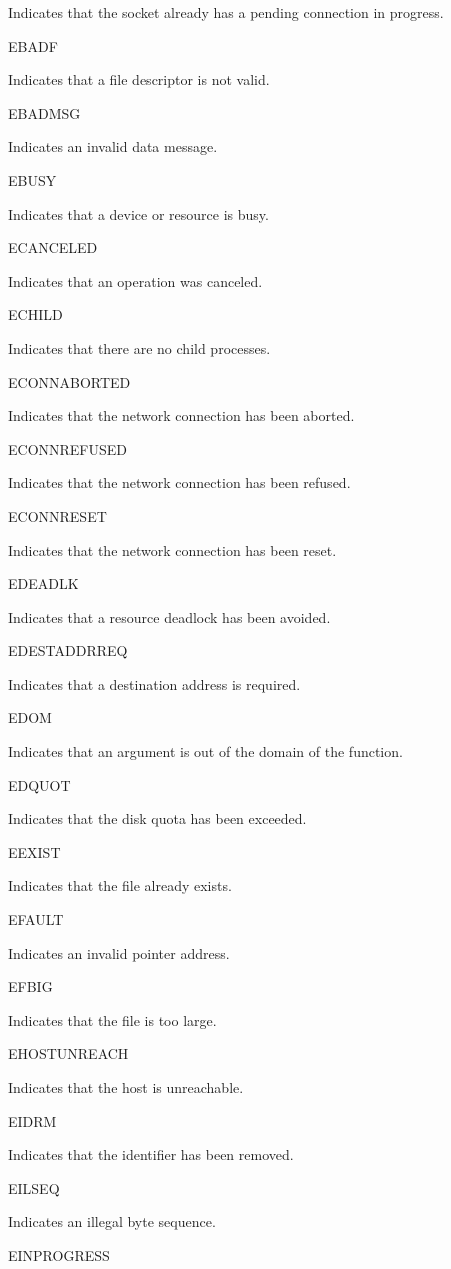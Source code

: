 Indicates that the socket already has a pending connection in progress.

EBADF

Indicates that a file descriptor is not valid.

EBADMSG

Indicates an invalid data message.

EBUSY

Indicates that a device or resource is busy.

ECANCELED

Indicates that an operation was canceled.

ECHILD

Indicates that there are no child processes.

ECONNABORTED

Indicates that the network connection has been aborted.

ECONNREFUSED

Indicates that the network connection has been refused.

ECONNRESET

Indicates that the network connection has been reset.

EDEADLK

Indicates that a resource deadlock has been avoided.

EDESTADDRREQ

Indicates that a destination address is required.

EDOM

Indicates that an argument is out of the domain of the function.

EDQUOT

Indicates that the disk quota has been exceeded.

EEXIST

Indicates that the file already exists.

EFAULT

Indicates an invalid pointer address.

EFBIG

Indicates that the file is too large.

EHOSTUNREACH

Indicates that the host is unreachable.

EIDRM

Indicates that the identifier has been removed.

EILSEQ

Indicates an illegal byte sequence.

EINPROGRESS

